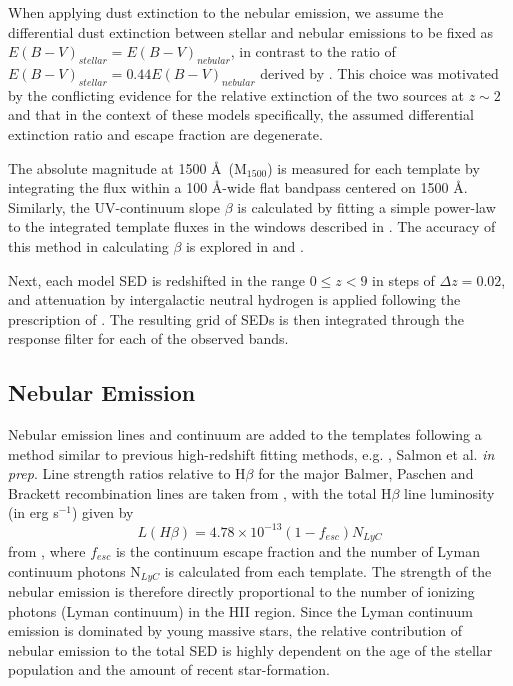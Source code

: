 When applying dust extinction to the nebular emission, we assume the differential dust extinction between stellar and nebular emissions to be fixed as $E(B-V)_{stellar} = E(B-V)_{nebular}$, in contrast to the ratio of $E(B-V)_{stellar} = 0.44 E(B-V)_{nebular}$ derived by \citet{2000ApJ...533..682C}. This choice was motivated by the conflicting evidence for the relative extinction of the two sources at $z \sim 2$ \citep{Erb:2006ke,ForsterSchreiber:2009hm} and that in the context of these models specifically, the assumed differential extinction ratio and escape fraction are degenerate.

The absolute magnitude at 1500 \AA ~(M$_{1500}$) is measured for each template by integrating the flux within a 100 \AA-wide flat bandpass centered on 1500 \AA. Similarly, the UV-continuum slope $\beta$ is calculated by fitting a simple power-law to the integrated template fluxes in the windows described in \citet{1994ApJ...429..582C}. The accuracy of this method in calculating $\beta$ is explored in \citet{Finkelstein:2012hr} and \citet{2013MNRAS.429.2456R}.

Next, each model SED is redshifted in the range $0 \le z < 9$ in steps of $\Delta z = 0.02$, and attenuation by intergalactic neutral hydrogen is applied following the prescription of \cite{1995ApJ...441...18M}. The resulting grid of SEDs is then integrated through the response filter for each of the observed bands. 

\subsection{Nebular Emission}\label{subsection:nebular}
Nebular emission lines and continuum are added to the templates following a method similar to previous high-redshift fitting methods, e.g.  \citet{Ono:2010ed,2010A&A...515A..73S,2011MNRAS.418.2074M}, Salmon et al. \emph{in prep}. Line strength ratios relative to H$\beta$ for the major Balmer, Paschen and Brackett recombination lines are taken from \cite{Osterbrock:2006ul}, with the total H$\beta$ line luminosity (in erg s$^{-1}$) given by
\begin{equation}
L(H\beta) = 4.78 \times10^{-13} (1-f_{esc}) N_{LyC}
\end{equation}
from \citet{1995A&A...303...41K}, where $f_{esc}$ is the continuum escape fraction and the number of Lyman continuum photons N$_{LyC}$ is calculated from each template. The strength of the nebular emission is therefore directly proportional to the number of ionizing photons (Lyman continuum) in the HII region. Since the Lyman continuum emission is dominated by young massive stars, the relative contribution of nebular emission to the total SED is highly dependent on the age of the stellar population and the amount of recent star-formation.  
 
